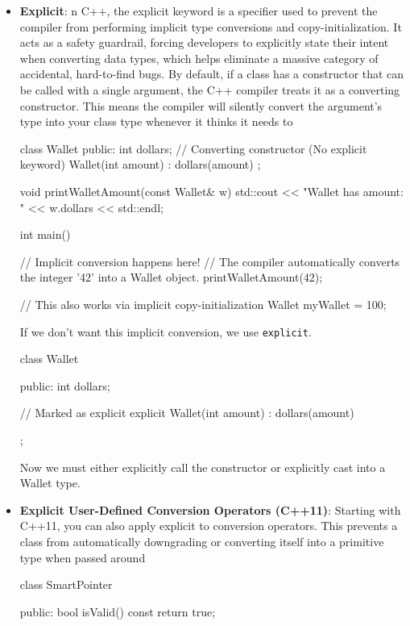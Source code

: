 \documentclass{report}
\begin{document}
    \begin{itemize}
        \item \textbf{Explicit}: n C++, the explicit keyword is a specifier used to prevent the compiler from performing implicit type conversions and copy-initialization. It acts as a safety guardrail, forcing developers to explicitly state their intent when converting data types, which helps eliminate a massive category of accidental, hard-to-find bugs.        
            \bigbreak \noindent 
            By default, if a class has a constructor that can be called with a single argument, the C++ compiler treats it as a converting constructor. This means the compiler will silently convert the argument's type into your class type whenever it thinks it needs to
            \bigbreak \noindent 
            \begin{cppcode}
                class Wallet {
                public:
                    int dollars;
                    // Converting constructor (No explicit keyword)
                    Wallet(int amount) : dollars(amount) {} 
                };

                void printWalletAmount(const Wallet& w) {
                    std::cout << "Wallet has amount: " << w.dollars << std::endl;
                }

                int main() {
                    // Implicit conversion happens here!
                    // The compiler automatically converts the integer '42' into a Wallet object.
                    printWalletAmount(42); 

                    // This also works via implicit copy-initialization
                    Wallet myWallet = 100; 
                }
            \end{cppcode}
            \bigbreak \noindent 
            If we don't want this implicit conversion, we use \texttt{explicit}.
            \bigbreak \noindent 
            \begin{cppcode}
                class Wallet {
                public:
                    int dollars;

                    // Marked as explicit
                    explicit Wallet(int amount) : dollars(amount) {} 
                };
            \end{cppcode}
            \bigbreak \noindent 
            Now we must either explicitly call the constructor or explicitly cast into a Wallet type.
        \item \textbf{Explicit User-Defined Conversion Operators (C++11)}: Starting with C++11, you can also apply explicit to conversion operators. This prevents a class from automatically downgrading or converting itself into a primitive type when passed around
            \bigbreak \noindent 
            \begin{cppcode}
                class SmartPointer {
                public:
                    bool isValid() const { return true; }

}
\end{cppcode}
\end{itemize}
\end{document}

